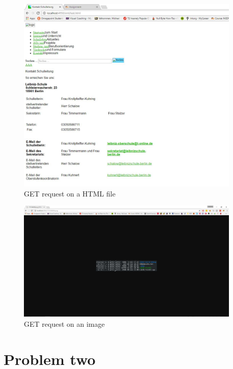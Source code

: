\documentclass[a4paper,12pt]{article}
\numberwithin{figure}{section}
\begin{document}
\begin{figure}[hp!]
	\centering
	\label{HTML}
	\includegraphics[width=0.95\textwidth,keepaspectratio]{img/HTMLFile.jpg} 
	\caption{GET request on a HTML file}
\end{figure}

\begin{figure}[hp!]
	\centering
	\label{image}
	\includegraphics[width=0.95\textwidth,keepaspectratio]{img/PNGFile.jpg} 
	\caption{GET request on an image}
\end{figure}

\newpage
\section{Problem two}
\end{document}
